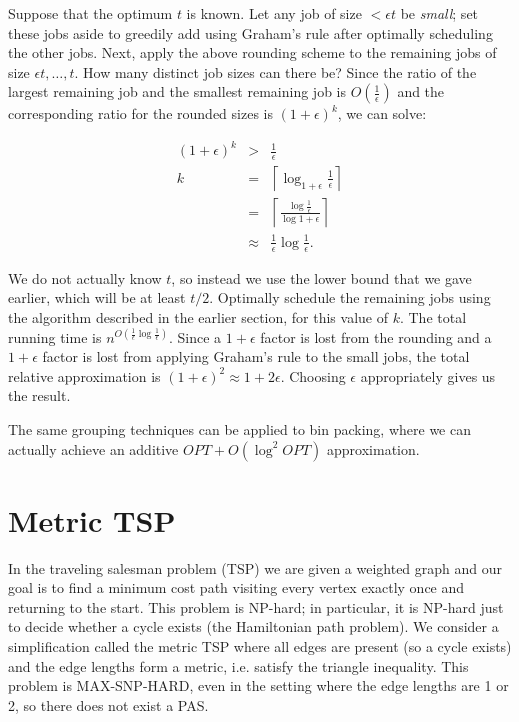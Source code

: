 \documentclass{article}
\begin{document}

Suppose that the optimum $t$ is known. Let any job of size $<
\epsilon t$ be {\em small}; set these jobs aside to greedily add using
Graham's rule after optimally scheduling the other jobs. Next, apply
the above rounding scheme to the remaining jobs of size $\epsilon t,
\ldots, t$. How many distinct job sizes can there be? Since the ratio
of the largest remaining job and the smallest remaining job is
$O(\frac{1}{\epsilon})$ and the corresponding ratio for the rounded
sizes is $(1+\epsilon)^k$, we can solve:

\begin{eqnarray*}
(1+\epsilon)^k & > & \frac{1}{\epsilon} \\
             k & = & \left \lceil \log_{1+\epsilon}{\frac{1}{\epsilon}} \right \rceil \\
               & = & \left \lceil \frac{\log{\frac{1}{\epsilon}}}{\log{1+\epsilon}} \right \rceil \\
               & \approx & \frac{1}{\epsilon} \log{\frac{1}{\epsilon}}.
\end{eqnarray*}

We do not actually know $t$, so instead we use the lower bound that we
gave earlier, which will be at least $t/2$.  Optimally schedule the
remaining jobs using the algorithm described in the earlier section,
for this value of $k$. The total running time is
$n^{O(\frac{1}{\epsilon} \log{\frac{1}{\epsilon}})}$. Since a
$1+\epsilon$ factor is lost from the rounding and a $1+\epsilon$
factor is lost from applying Graham's rule to the small jobs, the
total relative approximation is $(1+\epsilon)^2 \approx
1+2\epsilon$. Choosing $\epsilon$ appropriately gives us the result.

The same grouping techniques can be applied to bin packing, where we
can actually achieve an additive $OPT+O(\log^2 OPT)$ approximation.

\section{Metric TSP}

In the traveling salesman problem (TSP) we are given a weighted graph
and our goal is to find a minimum cost path visiting every vertex
exactly once and returning to the start. This problem is NP-hard; in
particular, it is NP-hard just to decide whether a cycle exists (the
Hamiltonian path problem). We consider a simplification called the
metric TSP where all edges are present (so a cycle exists) and the
edge lengths form a metric, i.e. satisfy the triangle inequality. 
This problem is MAX-SNP-HARD, even in the setting where the edge
lengths are 1 or 2, so there does not exist a PAS.
\end{document}
